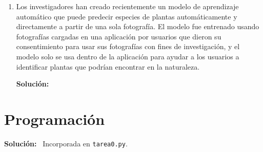 \documentclass[11pt,letterpaper]{article}
\newenvironment{solution}{%
  \noindent\begin{shaded}
  \textbf{Solución:}\ }{
  \end{shaded}%
}
\begin{document}
\begin{enumerate}
\item%
  Los investigadores han creado recientemente un modelo de aprendizaje
  automático que puede predecir especies de plantas automáticamente y
  directamente a partir de una sola fotografía.  El modelo fue
  entrenado usando fotografías cargadas en una aplicación por usuarios
  que dieron su consentimiento para usar sus fotografías con fines de
  investigación, y el modelo solo se usa dentro de la aplicación para
  ayudar a los usuarios a identificar plantas que podrían encontrar en
  la naturaleza.
  \begin{solution}
  \end{solution}
\end{enumerate}



\section*{Programación}

\begin{solution}
  Incorporada en \texttt{tarea0.py}.
\end{solution}
\end{document}
